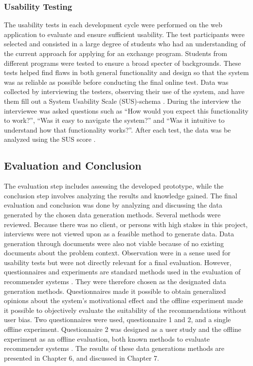 \subsubsection{Usability Testing}
The usability tests in each development cycle were performed on the web application to evaluate and ensure sufficient usability. The test participants were selected and consisted in a large degree of students who had an understanding of the current approach for applying for an exchange program. Students from different programs were tested to ensure a broad specter of backgrounds. These tests helped find flaws in both general functionality and design so that the system was as reliable as possible before conducting the final online test. Data was collected by interviewing the testers, observing their use of the system, and have them fill out a System Usability Scale (SUS)-schema \cite{brooke1996sus}. During the interview the interviewee was asked questions such as \enquote{How would you expect this functionality to work?}, \enquote{Was it easy to navigate the system?} and \enquote{Was it intuitive to understand how that functionality works?}. After each test, the data was be analyzed using the SUS score \cite{brooke1996sus}.

\subsection{Evaluation and Conclusion}

The evaluation step includes assessing the developed prototype, while the conclusion step involves analyzing the results and knowledge gained. The final evaluation and conclusion was done by analyzing and discussing the data generated by the chosen data generation methods. Several methods were reviewed. Because there was no client, or persons with high stakes in this project, interviews were not viewed upon as a feasible method to generate data. Data generation through documents were also not viable because of no existing documents about the problem context. Observation were in a sense used for usability tests but were not directly relevant for a final evaluation. However, questionnaires and experiments are standard methods used in the evaluation of recommender systems \cite{oates2005researching}. They were therefore chosen as the designated data generation methods. Questionnaires made it possible to obtain generalized opinions about the system's motivational effect and the offline experiment made it possible to objectively evaluate the suitability of the recommendations without user bias. Two questionnaires were used, questionnaire 1 and 2, and a single offline experiment. Questionnaire 2 was designed as a user study and the offline experiment as an offline evaluation, both known methods to evaluate recommender systems \cite{shani2011evaluating}. The results of these data generations methods are presented in Chapter 6, and discussed in Chapter 7. 


